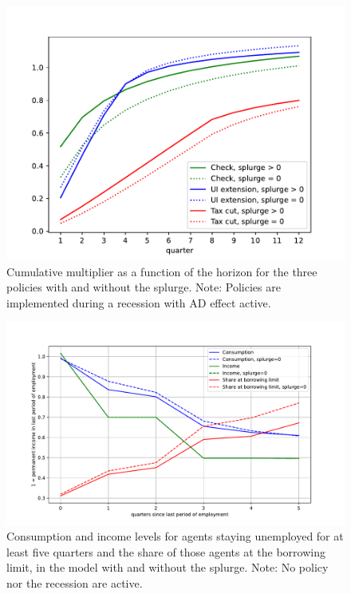 \documentclass[\econtexRoot/HAFiscal]{subfiles}
\begin{document}
\begin{figure}[t]
	\centering
	\includegraphics[width=0.8\linewidth]{Code/HA-Models/FromPandemicCode/Figures/Splurge0/Cummulative_multipliers_SplurgeComp}
	\caption{Cumulative multiplier as a function of the horizon for the three policies with and without the splurge. Note: Policies are implemented during a recession with AD effect active.}
	\notinsubfile{\label{fig:cumulativemultipliers_SplurgeComp}}
\end{figure}

\begin{figure}[t]
	\centering
	\includegraphics[width=0.8\linewidth]{Code/HA-Models/FromPandemicCode/Figures/Splurge0/UIextension_CompSplurge0}
	\caption{Consumption and income levels for agents staying unemployed for at least five quarters and the share of those agents at the borrowing limit, in the model with and without the splurge. Note: No policy nor the recession are active.}
	\notinsubfile{\label{fig:UIextension_CompSplurge0}}
\end{figure}
\end{document}
